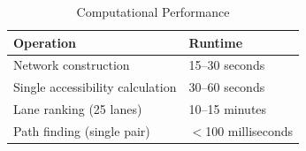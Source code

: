 \begin{table}[H]
\centering
\caption{Computational Performance}
\label{tab:performance}
\begin{tabular}{@{}ll@{}}
\toprule
\textbf{Operation} & \textbf{Runtime} \\
\midrule
Network construction & 15--30 seconds \\
Single accessibility calculation & 30--60 seconds \\
Lane ranking (25 lanes) & 10--15 minutes \\
Path finding (single pair) & $<$100 milliseconds \\
\bottomrule
\end{tabular}
\end{table}

